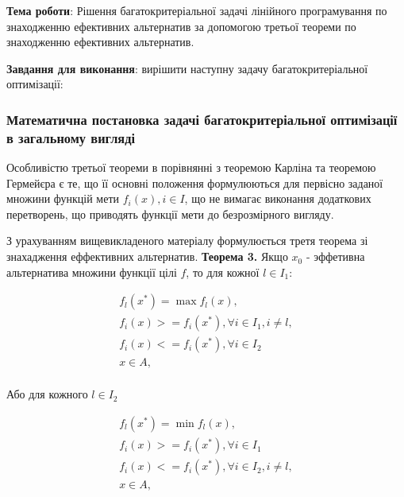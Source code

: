 


\newcommand{\labnumber}{3} %



\usepackage{systeme}
\usepackage{longtable,tabu}
\usepackage{multirow}
\usepackage{array,multirow}
\usepackage{pdflscape}
\usepackage{afterpage}
\usepackage{bm}

\graphicspath{{../figures/}}


\Ukrainian


\addtocounter{page}{1}

\textbf{Тема роботи}: Рішення багатокритеріальної задачі лінійного програмування по знаходженню ефективних альтернатив за допомогою третьої теореми по знаходженню ефективних альтернатив.

\textbf{Завдання для виконання}: вирішити наступну задачу багатокритеріальної оптимізації:


\subsubsection{Математична постановка задачі багатокритеріальної оптимізації в загальному вигляді}
Особливістю третьої теореми в порівнянні з теоремою Карліна та теоремою Гермейєра є те, що її основні положення формулюються для первісно заданої множини функцій мети ${f_i(x), i \in I}$, що не вимагає виконання додаткових перетворень, що приводять функції мети до безрозмірного вигляду. 

З урахуванням вищевикладеного матеріалу формулюється третя теорема зі знахадження еффективних альтернатив.
\textbf{Теорема 3.} 
Якщо $x_0$ - эффетивна альтернатива множини функції цілі $f$, то для кожної $l \in I_1$:

\begin{gather*} 
    f_l (x^*) = \max {f_l(x)}, \\
    f_i (x) >= f_i(x^*), \forall i \in I_1, i \not = l, \\
    f_i (x) <= f_i(x^*), \forall i \in I_2 \\
    x \in A, \\
\end{gather*}

Або для кожного $l \in I_2$

\begin{gather*} 
    f_l (x^*) = \min{f_l(x)}, \\
    f_i (x) >= f_i(x^*), \forall i \in I_1 \\
    f_i (x) <= f_i(x^*), \forall i \in I_2, i \not = l, \\
    x \in A, \\
\end{gather*}

